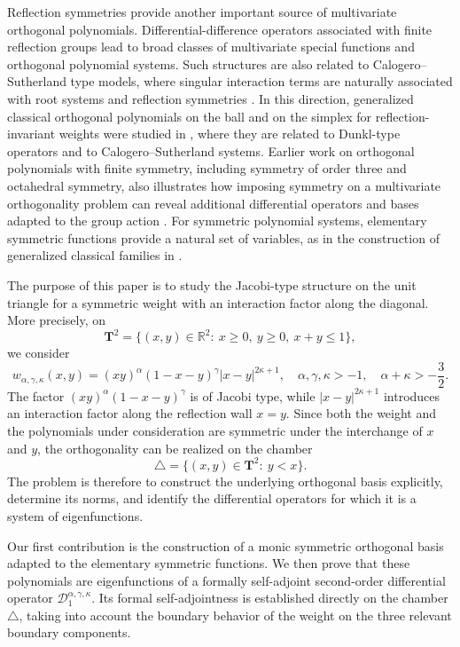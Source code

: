 \documentclass[reqno,10pt]{amsart}
\theoremstyle{plain}
\numberwithin{equation}{section}
\numberwithin{figure}{section}
\begin{document}
Reflection symmetries provide another important source of multivariate
orthogonal polynomials. Differential-difference operators associated with
finite reflection groups \cite{Dunkl89} lead to broad classes of
multivariate special functions and orthogonal polynomial systems. Such structures are also related to
Calogero--Sutherland type models, where singular interaction terms are
naturally associated with root systems and reflection symmetries
\cite{BF97}. In this direction, generalized classical orthogonal polynomials
on the ball and on the simplex for reflection-invariant weights were studied
in \cite{Xu01}, where they are related to Dunkl-type operators and to
Calogero--Sutherland systems. Earlier work on orthogonal polynomials with
finite symmetry, including symmetry of order three and octahedral symmetry,
also illustrates how imposing symmetry on a multivariate orthogonality
problem can reveal additional differential operators and bases adapted to the
group action \cite{Dunkl84a,Dunkl84b}. For symmetric polynomial systems,
elementary symmetric functions provide a natural set of variables, as in the
construction of generalized classical families in \cite{BP23}.

The purpose of this paper is to study the Jacobi-type structure on the unit
triangle for a symmetric weight with an interaction factor along the diagonal.
More precisely, on
\[
\mathbf T^2=\{(x,y)\in\mathbb R^2:\ x\ge0,\ y\ge0,\ x+y\le1\},
\]
we consider
\[
w_{\alpha,\gamma,\kappa}(x,y)
=
(xy)^\alpha(1-x-y)^\gamma |x-y|^{2\kappa+1},
\quad
\alpha,\gamma,\kappa>-1, \quad \alpha+\kappa>-\frac32.
\]
The factor \((xy)^\alpha(1-x-y)^\gamma\) is of Jacobi type, while
\(|x-y|^{2\kappa+1}\) introduces an interaction factor along the
reflection wall \(x=y\). Since both the weight and the polynomials under
consideration are symmetric under the interchange of \(x\) and \(y\), the
orthogonality can be realized on the chamber
\[
\triangle=\{(x,y)\in\mathbf T^2:\ y<x\}.
\]
The problem is therefore to construct the underlying orthogonal basis
explicitly, determine its norms, and identify the differential operators for
which it is a system of eigenfunctions.

Our first contribution is the construction of a monic symmetric orthogonal
basis adapted to the elementary symmetric functions. We then prove that these
polynomials are eigenfunctions of a formally self-adjoint second-order
differential operator \(\mathcal D_1^{\alpha,\gamma,\kappa}\). Its formal
self-adjointness is established directly on the chamber \(\triangle\), taking
into account the boundary behavior of the weight on the three relevant
boundary components.
\end{document}
